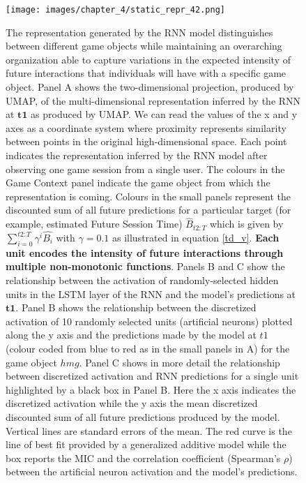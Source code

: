 \begin{figure}[ht]
\centering
\texttt{[image: images/chapter\_4/static\_repr\_42.png]}
\caption[\textbf{Lower dimensional representation of the latent state generated by the RNN architecture}]{The representation generated by the RNN model distinguishes between different game objects while maintaining an overarching organization able to capture variations in the expected intensity of future interactions that individuals will have with a specific game object. Panel A shows the two-dimensional projection, produced by UMAP, of the multi-dimensional representation inferred by the RNN at $\mathbf{t1}$ as produced by UMAP. We can read the values of the x and y axes as a coordinate system where proximity represents similarity between points in the original high-dimensional space. Each point indicates the representation inferred by the RNN model after observing one game session from a single user. The colours in the Game Context panel indicate the game object from which the representation is coming. Colours in the small panels represent the discounted sum of all future predictions for a particular target (for example, estimated Future Session Time) $\widehat{B}_{t2:T}$ which is given by $\sum_{i=0}^{t2:T} \gamma^i\widehat{B_i}$ with $\gamma=0.1$ as illustrated in equation \ref{td_v}. \textbf{Each unit  encodes the intensity of future interactions through multiple non-monotonic functions}. Panels B and C show the relationship between the activation of randomly-selected hidden units in the LSTM layer of the RNN and the model's predictions at $\mathbf{t1}$. Panel B shows the relationship between the discretized activation of 10 randomly selected units (artificial neurons) plotted along the y axis and the predictions made by the model at $t1$ (colour coded from blue to red as in the small panels in A) for the game object $hmg$. Panel C shows in more detail the relationship between discretized activation and RNN predictions for a single unit highlighted by a black box in Panel B. Here the x axis indicates the discretized activation while the y axis the mean discretized discounted sum of all future predictions produced by the model. Vertical lines are standard errors of the mean. The red curve is the line of best fit provided by a generalized additive model \cite{serven2018} while the box reports the MIC and the correlation coefficient (Spearman's $\rho$) between the artificial neuron activation and the model's predictions.}
\label{full_panel_static}
\end{figure}

